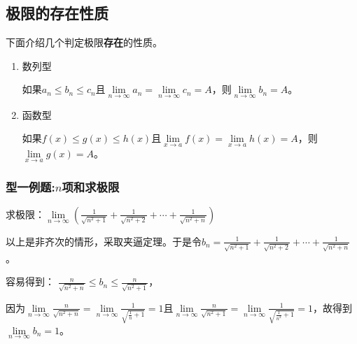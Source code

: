 \documentclass[cn,12pt,chinese]{elegantbook}
\begin{document}
    \subsection{极限的存在性质}
    下面介绍几个判定极限\textbf{存在}的性质。
    \begin{property}
    \begin{enumerate}
        \item 数列型
       
        如果$ a_n\leq b_n\leq c_n $且$ \lim\limits_{n \to \infty}a_n=\lim\limits_{n \to \infty}c_n=A $，则$ \lim\limits_{n \to \infty}b_n=A $。
        \item 函数型
        
        如果$ f(x)\leq g(x)\leq h(x) $且$ \lim\limits_{x \to a}f(x)=\lim\limits_{x \to a}h(x)=A $，则$ \lim\limits_{x \to a}g(x)=A $。
    \end{enumerate}
    \end{property}
    \subsubsection*{型一例题:$n$项和求极限}
    \begin{example}
        求极限：$\lim\limits_{n \to \infty}(\displaystyle\frac{1}{\sqrt{n^2+1}}+\displaystyle\frac{1}{\sqrt{n^2+2}}+ \cdots +\frac{1}{\sqrt{n^2+n}})$
    \end{example}
    \begin{solution}
        以上是非齐次的情形，采取夹逼定理。于是令$b_n=\displaystyle\frac{1}{\sqrt{n^2+1}}+\displaystyle\frac{1}{\sqrt{n^2+2}}+ \cdots +\frac{1}{\sqrt{n^2+n}}$。
        
        容易得到：
        $\displaystyle\frac{n}{\sqrt{n^2+n}}\leq b_n \leq \displaystyle\frac{n}{\sqrt{n^2+1}}$，
        
        因为$\lim\limits_{n \to \infty}\displaystyle\frac{n}{\sqrt{n^2+n}}=\lim\limits_{n\to\infty}\displaystyle\frac{1}{\sqrt{\frac{1}{n}+1}}=1$且$\lim\limits_{n \to \infty}\displaystyle\frac{n}{\sqrt{n^2+1}}=\lim\limits_{n\to\infty}\displaystyle\frac{1}{\sqrt{\frac{1}{n^2}+1}}=1$，故得到$\lim\limits_{n \to \infty}b_n=1$。
    \end{solution}
\end{document}

